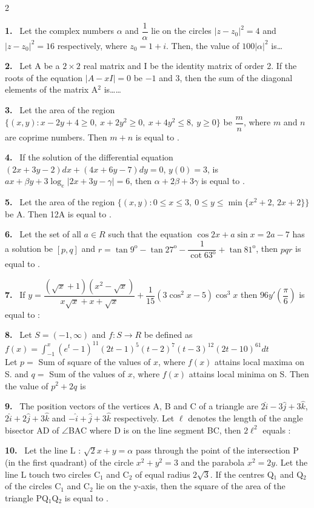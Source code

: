 \documentclass[10pt]{extarticle}
\newcommand{\qn}[1]{\par\smallskip\noindent\textbf{#1.}~}
\begin{document}
\begin{multicols}{2}
\qn{1} Let the complex numbers $\alpha$ and $\dfrac1\alpha$ lie on the circles $|z-z_0|^2=4$ and $|z-z_0|^2=16$ respectively, where $z_0=1+i$. Then, the value of $100|\alpha|^2$ is\dots

\qn{2} Let A be a $2\times2$ real matrix and I be the identity matrix of order 2. If the roots of the equation $|A-xI|=0$ be $-1$ and 3, then the sum of the diagonal elements of the matrix A$^2$ is\dots\dots

\qn{3} Let the area of the region $\{(x,y):x-2y+4\geq0,\ x+2y^2\geq0,\ x+4y^2\leq8,\ y\geq0\}$ be $\dfrac mn$, where $m$ and $n$ are coprime numbers. Then $m+n$ is equal to \underline{\hspace{2em}}.

\qn{4} If the solution of the differential equation $(2x+3y-2)dx+(4x+6y-7)dy=0$, $y(0)=3$, is $ax+\beta y+3\log_e|2x+3y-\gamma|=6$, then $\alpha+2\beta+3\gamma$ is equal to \underline{\hspace{2em}}.

\qn{5} Let the area of the region $\{(x,y):0\leq x\leq3,\ 0\leq y\leq\min\{x^2+2,\,2x+2\}\}$ be A. Then 12A is equal to \underline{\hspace{2em}}.

\qn{6} Let the set of all $a\in R$ such that the equation $\cos2x+a\sin x=2a-7$ has a solution be $[p,q]$ and $r=\tan9^\mathrm{o}-\tan27^\mathrm{o}-\dfrac1{\cot63^\mathrm{o}}+\tan81^\mathrm{o}$, then $pqr$ is equal to \underline{\hspace{2em}}.

\qn{7} If $y=\dfrac{\left(\sqrt x+1\right)\left(x^2-\sqrt x\right)}{x\sqrt x+x+\sqrt x}+\dfrac1{15}\left(3\cos^2x-5\right)\cos^3x$ then $96y'\left(\dfrac\pi6\right)$ is equal to :

\qn{8} Let $S=(-1,\infty)$ and $f:S\to R$ be defined as\\
$f(x)=\displaystyle\int_{-1}^x\left(e^t-1\right)^{11}(2t-1)^5(t-2)^7(t-3)^{12}(2t-10)^{61}dt$\\
Let $p=$ Sum of square of the values of $x$, where $f(x)$ attains local maxima on S. and $q=$ Sum of the values of $x$, where $f(x)$ attains local minima on S. Then the value of $p^2+2q$ is \underline{\hspace{2em}}

\qn{9} The position vectors of the vertices A, B and C of a triangle are $2\hat i-3\hat j+3\hat k$, $2\hat i+2\hat j+3\hat k$ and $-\hat i+\hat j+3\hat k$ respectively. Let $\ell$ denotes the length of the angle bisector AD of $\angle$BAC where D is on the line segment BC, then $2\ell^2$ equals :

\qn{10} Let the line L : $\sqrt2x+y=\alpha$ pass through the point of the intersection P (in the first quadrant) of the circle $x^2+y^2=3$ and the parabola $x^2=2y$. Let the line L touch two circles C$_1$ and C$_2$ of equal radius $2\sqrt3$. If the centres Q$_1$ and Q$_2$ of the circles C$_1$ and C$_2$ lie on the y-axis, then the square of the area of the triangle PQ$_1$Q$_2$ is equal to \underline{\hspace{2em}}.

\end{multicols}
\end{document}

